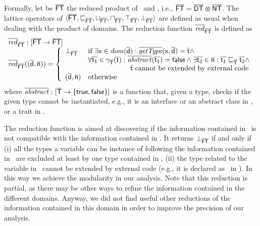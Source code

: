 \documentclass{llncs}
\begin{document}
Formally, let be $\mathsf{\overline{FT}}$ the reduced product of \dynamictype\ and \nottype, i.e., $\mathsf{\overline{FT}}=\mathsf{\overline{DT}} \varotimes \mathsf{\overline{NT}}$. The lattice operators of $\langle \mathsf{\overline{FT}}, \sqsubseteq_{\mathsf{\overline{FT}}}, \sqcup_{\mathsf{\overline{FT}}}, \sqcap_{\mathsf{\overline{FT}}}, \top_{\mathsf{\overline{FT}}}, \bot_{\mathsf{\overline{FT}}} \rangle$ are defined as usual when dealing with the product of domains. The reduction function $\overline{\mathit{red}}_{\mathsf{\overline{FT}}}$ is defined as
\[
\begin{array}{l}
\overline{\mathit{red}}_{\mathsf{\overline{FT}}} : [\mathsf{\overline{FT}} \rightarrow\mathsf{\overline{FT}}]\\
\overline{\mathit{red}}_{\mathsf{\overline{FT}}}((\mathsf{\overline{d}}, \mathsf{\overline{n}})) = \left\{
\begin{array}{ll}
\bot_{\mathsf{\overline{FT}}} & \textrm{if } \exists \mathsf{x} \in \mathit{dom}(\mathsf{\overline{d}}) : \overline{\mathit{getType}}(\mathsf{x}, \mathsf{\overline{d}})=\mathsf{\overline{t}} \land\\
& \forall \mathsf{\overline{t_1}} \in \gamma_{\mathsf{\overline{T}}}(\mathsf{\overline{t}}) : \overline{\mathit{abstract}}(\mathsf{\overline{t_1}})=\mathsf{false} \land \exists \mathsf{\overline{t_2}} \in \mathsf{\overline{n}} : \mathsf{\overline{t_1}} \sqsubseteq_{\mathsf{\overline{T}}} \mathsf{\overline{t_2}} \land\\
& \hspace{60pt} \mathsf{\overline{t}} \textrm{ cannot be extended by external code}\\
(\mathsf{\overline{d}}, \mathsf{\overline{n}}) & \textrm{otherwise}\\
\end{array}
\right.
\end{array}
\]
where $\overline{\mathit{abstract}} :[\mathsf{\overline{T}} \rightarrow\{\mathsf{true}, \mathsf{false}\}]$ is a function that, given a type, checks if the given type cannot be instantiated, e.g., it is an interface or an abstract class in \Java, or a trait in \Scala.

The reduction function is aimed at discovering if the information contained in \nottype\ is not compatible with the information contained in \dynamictype. It returns $\bot_{\mathsf{\overline{FT}}}$ if and only if (i) all the types a variable can be instance of following the information contained in \dynamictype\ are excluded at least by one type contained in \nottype, (ii) the type related to the variable in \dynamictype\ cannot be extended by external code (e.g., it is declared as \ in \Scala). In this way we achieve the modularity in our analysis. Note that this reduction is partial, as there may be other ways to refine the information contained in the different domains. Anyway, we did not find useful other reductions of the information contained in this domain in order to improve the precision of our analysis.
\end{document}
